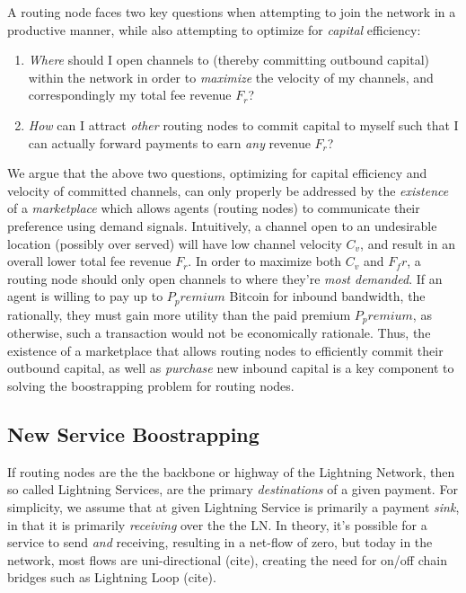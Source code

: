 \documentclass[12pt,a4paper]{article}
\theoremstyle{definition}
\begin{document}
A routing node faces two key questions when attempting to join the network in a
productive manner, while also attempting to optimize for \emph{capital}
efficiency: 

\begin{enumerate}
        \item \emph{Where} should I open channels to (thereby committing
            outbound capital) within the network in order to \emph{maximize}
            the velocity of my channels, and correspondingly my total fee
            revenue $F_r$? 

        \item \emph{How} can I attract \emph{other} routing nodes to commit
            capital to myself such that I can actually forward payments to earn
            \emph{any} revenue $F_r$?
\end{enumerate}

We argue that the above two questions, optimizing for capital efficiency and
velocity of committed channels, can only properly be addressed by the
\emph{existence} of a \emph{marketplace} which allows agents (routing nodes) to
communicate their preference using demand signals. Intuitively, a channel open
to an undesirable location (possibly over served) will have low channel
velocity $C_{v}$, and result in an overall lower total fee revenue $F_r$. In
order to maximize both $C_v$ and $F_fr$, a routing node should only open
channels to where they're \emph{most demanded}. If an agent is willing to pay
up to $P_premium$ Bitcoin for inbound bandwidth, the rationally, they must gain
more utility than the paid premium $P_premium$, as otherwise, such a
transaction would not be economically rationale. Thus, the existence of a
marketplace that allows routing nodes to efficiently commit their outbound
capital, as well as \emph{purchase} new inbound capital is a key component to
solving the boostrapping problem for routing nodes. 


\subsection{New Service Boostrapping}

If routing nodes are the the backbone or highway of the Lightning Network, then
so called Lightning Services, are the primary \emph{destinations} of a given
payment. For simplicity, we assume that at given Lightning Service is primarily
a payment \emph{sink}, in that it is primarily \emph{receiving} over the the
LN. In theory, it's possible for a service to send \emph{and} receiving,
resulting in a net-flow of zero, but today in the network, most flows are
uni-directional (cite), creating the need for on/off chain bridges such as
Lightning Loop (cite). 
\end{document}
